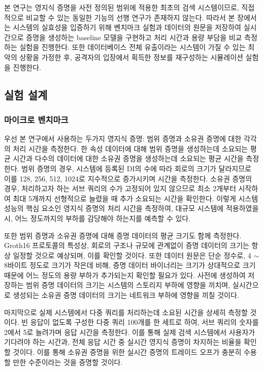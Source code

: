 
본 연구는 영지식 증명을 사전 정의된 범위에 적용한 최초의 검색 시스템이므로, 직접적으로 비교할 수 있는 동일한 기능의 선행 연구가 존재하지 않는다. 따라서 본 장에서는 시스템의 실효성을 입증하기 위해 벤치마크 실험과 데이터의 원문을 저장하여 실시간으로 증명을 생성하는 baseline 모델을 구현하고 처리 시간과 용량 부담을 비교 측정하는 실험을 진행한다. 또한 데이터베이스 전체 유출이라는 시스템이 가질 수 있는 최악의 상황을 가정한 후, 공격자의 입장에서 획득한 정보를 재구성하는 시뮬레이션 실험을 진행한다.

\subsection{실험 설계}

\subsubsection{마이크로 벤치마크}
우선 본 연구에서 사용하는 두가지 영지식 증명: 범위 증명과 소유권 증명에 대한 각각의 처리 시간을 측정한다. 한 속성 데이터에 대해 범위 증명을 생성하는데 소요되는 평균 시간과 다수의 데이터에 대한 소유권 증명을 생성하는데 소요되는 평균 시간을 측정한다. 범위 증명의 경우, 시스템에 등록된 DI의 수에 따라 회로의 크기가 달라지므로 이를 128, 256, 512, 1024로 지수적으로 증가시키며 시간을 측정한다. 소유권 증명의 경우, 처리하고자 하는 서브 쿼리의 수가 고정되어 있지 않으므로 최소 2개부터 시작하여 최대 5개까지 선형적으로 늘렸을 때 추가 소요되는 시간을 확인한다. 이렇게 시스템 성능의 핵심 요소인 영지식 증명의 처리 시간을 측정하여, 대규모 시스템에 적용하였을 시, 어느 정도까지의 부하를 감당해야 하는지를 예측할 수 있다.

\bigskip

또한 범위 증명과 소유권 증명에 대해 증명 데이터의 평균 크기도 함께 측정한다. Groth16 프로토콜의 특성상, 회로의 구조나 규모에 관계없이 증명 데이터의 크기는 항상 일정할 것으로 예상되며, 이를 확인할 것이다. 또한 데이터 원문은 단순 정수로, 4 $\sim$ 8바이트 정도로 크기가 작은데 비해, 증명 데이터 바이너리는 크기가 상대적으로 크기 때문에 어느 정도의 용량 부하가 추가되는지 확인할 필요가 있다. 사전에 생성하여 저장하는 범위 증명 데이터의 크기는 시스템의 스토리지 부하에 영향을 끼치며, 실시간으로 생성되는 소유권 증명 데이터의 크기는 네트워크 부하에 영향을 끼칠 것이다.

\bigskip

마지막으로 실제 시스템에서 다중 쿼리를 처리하는데 소요된 시간을 상세히 측정할 것이다. 빈 응답이 없도록 구성한 다중 쿼리 100개를 한 세트로 하여, 서브 쿼리의 숫자를 2에서 5로 늘려가며 응답 시간을 측정한다. 이를 통해 실제 검색 시스템에서 사용자가 기다려야 하는 시간과, 전체 응답 시간 중 실시간 영지식 증명이 차지하는 비율을 확인할 것이다. 이를 통해 소유권 증명을 위한 실시간 증명의 트레이드 오프가 충분히 수용할 만한 수준이라는 것을 증명할 것이다.

